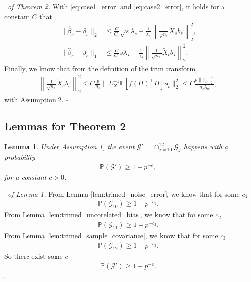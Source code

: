 \documentclass[12pt]{article}
\newtheorem{lemma}{Lemma}
\newenvironment{pf}{{\noindent \it Proof}\ }{\hfill $\square$\par}
\begin{document}
\begin{pf}{\it of Theorem 2. }
        With \eqref{eq:case1_error} and \eqref{eq:case2_error}, it holds for a constant $C$ that
        \begin{align*}
            \|\hat{\beta}_s - \beta_s\|_2 & \le \frac{C}{C_r}\sqrt{s}\lambda_s + \frac{1}{\lambda_s} \left\|\frac{1}{\sqrt{n_s}}\tilde{X}_s b_s\right\|_2^2,\\
            \|\hat{\beta}_s - \beta_s\|_1 & \le \frac{C}{C_r} s\lambda_s + \frac{1}{\lambda_s} \left\|\frac{1}{\sqrt{n_s}}\tilde{X}_s b_s\right\|_2^2. 
        \end{align*}
        Finally, we know that from the definition of the trim transform, 
        \begin{align*}
            \left\|\frac{1}{\sqrt{n_s}}\tilde{X}_s b_s\right\|^2_2 \le C\frac{p}{n_s}\|\Sigma_X^{-1} \mathbb{E}[f(H)^\top H]\phi_t\|^2_2 \le C \frac{p\|\phi_t\|_2^2}{n_s \lambda_\Psi^2},
        \end{align*}
        with Assumption 2. 
\end{pf}
\subsection{Lemmas for Theorem 2}
\begin{lemma}
    \label{lem:high_probability_set2}
    Under Assumption 1, the event $\mathcal{G}' = \cap_{j=10}^{12}\mathcal{G}_j$ happens with a probability 
    \begin{align*}
        \mathbb{P}\left(\mathcal{G}'\right) \ge 1 - p^{-c},
    \end{align*}
    for a constant $c>0$. 
\end{lemma}
\begin{pf}{\it of Lemma \ref{lem:high_probability_set2}. }
    From Lemma \ref{lem:trimed_noise_error}, we know that for some $c_1$
    \begin{align*}
        \mathbb{P}(\mathcal{G}_{10}) \ge 1- p^{-c_1}.
    \end{align*}
    From Lemma \ref{lem:trimed_uncorelated_bias}, we know that for some $c_2$ 
    \begin{align*}
        \mathbb{P}(\mathcal{G}_{11}) \ge 1- p^{-c_2}.
    \end{align*}
    From Lemma \ref{lem:trimed_sample_covariance}, we know that for some $c_3$
    \begin{align*}
        \mathbb{P}(\mathcal{G}_{12}) \ge 1- p^{-c_3}.
    \end{align*}
    So there exist some $c$
    \begin{align*}
        \mathbb{P}(\mathcal{G}') \ge 1-p^{-c}.
    \end{align*}
\end{pf}
\end{document}
